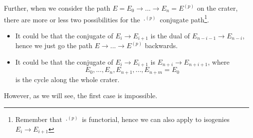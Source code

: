 \documentclass{scrartcl}
\theoremstyle{definition}
\begin{document}
Further, when we consider the path $E = E_0 \to ... \to E_n = E^{(p)}$ on the crater, there are more or less two possibilities for the $\cdot^{(p)}$ conjugate path\footnote{Remember that $\cdot^{(p)}$ is functorial, hence we can also apply to isogenies $E_i \to E_{i + 1}$}.
\begin{itemize}
    \item It could be that the conjugate of $E_i \to E_{i + 1}$ is the dual of $E_{n - i - 1} \to E_{n - i}$, hence we just go the path $E \to ... \to E^{(p)}$ backwards.
    \item It could be that the conjugate of $E_i \to E_{i + 1}$ is $E_{n + i} \to E_{n + i + 1}$, where
    \begin{equation*}
        E_0, ..., E_n, E_{n + 1}, ..., E_{n + m} = E_0
    \end{equation*}
    is the cycle along the whole crater.
\end{itemize}
However, as we will see, the first case is impossible.
\end{document}
